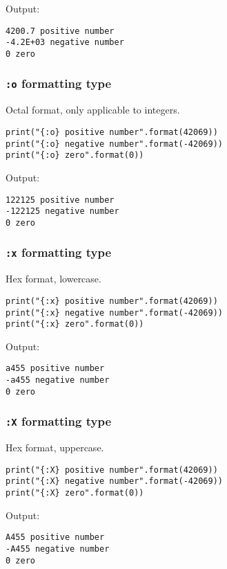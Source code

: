 \documentclass[11pt]{article}
\begin{document}
 \noindent Output:

\begin{verbatim}
4200.7 positive number
-4.2E+03 negative number
0 zero
\end{verbatim}

\subsubsection{\texttt{:o} formatting type}
\label{sec:org7825d59}
Octal format, only applicable to integers.

\begin{verbatim}
print("{:o} positive number".format(42069))
print("{:o} negative number".format(-42069))
print("{:o} zero".format(0))
\end{verbatim}

 \noindent Output:

\begin{verbatim}
122125 positive number
-122125 negative number
0 zero
\end{verbatim}

\subsubsection{\texttt{:x} formatting type}
\label{sec:org7033c1d}
Hex format, lowercase.

\begin{verbatim}
print("{:x} positive number".format(42069))
print("{:x} negative number".format(-42069))
print("{:x} zero".format(0))
\end{verbatim}

 \noindent Output:

\begin{verbatim}
a455 positive number
-a455 negative number
0 zero
\end{verbatim}

\subsubsection{\texttt{:X} formatting type}
\label{sec:org1c5318b}
Hex format, uppercase.

\begin{verbatim}
print("{:X} positive number".format(42069))
print("{:X} negative number".format(-42069))
print("{:X} zero".format(0))
\end{verbatim}

 \noindent Output:

\begin{verbatim}
A455 positive number
-A455 negative number
0 zero
\end{verbatim}
\end{document}
